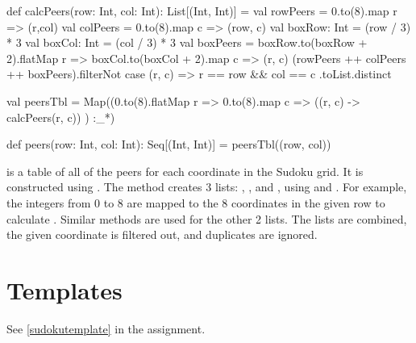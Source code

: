 \begin{scalacode}
  def calcPeers(row: Int, col: Int): List[(Int, Int)] = {
    val rowPeers = 0.to(8).map { r => (r,col) }
    val colPeers = 0.to(8).map { c => (row, c) }
    val boxRow: Int = (row / 3) * 3
    val boxCol: Int = (col / 3) * 3
    val boxPeers = boxRow.to(boxRow + 2).flatMap { r =>
      boxCol.to(boxCol + 2).map { c =>
        (r, c)
      }
    }
    (rowPeers ++ colPeers ++ boxPeers).filterNot {
      case (r, c) => r == row && col == c
    }.toList.distinct
  }

  val peersTbl = Map((0.to(8).flatMap { r =>
    0.to(8).map { c =>
      ((r, c) -> calcPeers(r, c))
    }
  }) :_*)

  def peers(row: Int, col: Int): Seq[(Int, Int)] = peersTbl((row, col))
\end{scalacode}

 is a table of all of the peers for each coordinate in the Sudoku grid.
It is constructed using . The  method creates 
3 lists: , , and , using 
 and . For example, the integers from 0 to 8 are mapped
to the 8 coordinates in the given row to calculate . Similar methods are used for the other 2 lists. The lists are combined, the given coordinate is filtered out, and duplicates are ignored.

\section{Templates}

See \cref{sudokutemplate} in the assignment.